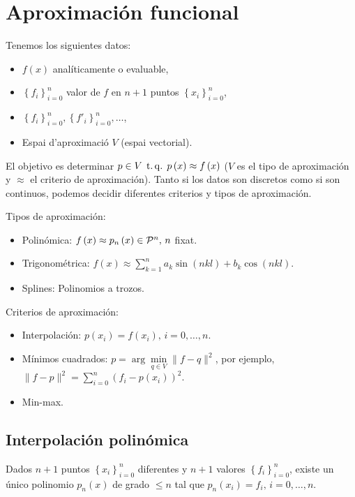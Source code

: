 \chapter{Aproximación funcional}

\noindent Tenemos los siguientes datos:
\begin{itemize}
    \item $f\left( x \right)$ analíticamente o evaluable,
    \item $\left\{ f_i \right\}^n_{i=0}$ valor de $f$ en $n+1$ puntos $\left\{ x_i \right\}^n_{i=0}$,
    \item $\left\{ f_i \right\}^n_{i=0},\left\{ f'_i \right\}^n_{i=0},\dots$,
    \item Espai d'aproximació $V$ (espai vectorial).
\end{itemize}

\noindent El objetivo es determinar $p\in V\operatorname{\;t.q.\;} p\left( x \right) \approx f\left( x \right)$ ($V$ es el tipo de aproximación y $\approx$ el criterio de aproximación). Tanto si los datos son discretos como si son continuos, podemos decidir diferentes criterios y tipos de aproximación. %

\quad

\noindent Tipos de aproximación:
\begin{itemize}
    \item Polinómica: $f\left( x \right)\approx p_n\left( x \right) \in \mathcal{P}^n,\, n$ fixat.
    \item Trigonométrica: $f\left( x \right)\approx \sum\limits^n_{k=1} a_k \sin\left( nkl \right) + b_k \cos\left( nkl \right)$.
    \item Splines: Polinomios a trozos.
\end{itemize}
Criterios de aproximación:
\begin{itemize}
    \item Interpolación: $p\left( x_i \right) = f\left( x_i \right), \, i=0,\dots,n$.
    \item Mínimos cuadrados: $p = \arg\min\limits_{q\in V} \|f-q\|^2$, por ejemplo, $\|f-p\|^2 = \sum\limits^n_{i=0} \left( f_i -p\left( x_i \right) \right)^2$.
    \item Min-max.
\end{itemize}

\section{Interpolación polinómica}

\begin{teo*}
    Dados $n+1$ puntos $\left\{ x_i \right\}^n_{i=0}$ diferentes y $n+1$ valores $\left\{ f_i \right\}^n_{i=0}$, existe un único polinomio $p_n\left( x \right)$ de grado $\leq n$ tal que $p_n\left( x_i \right) = f_i,\, i=0,\dots,n$.
\end{teo*}

